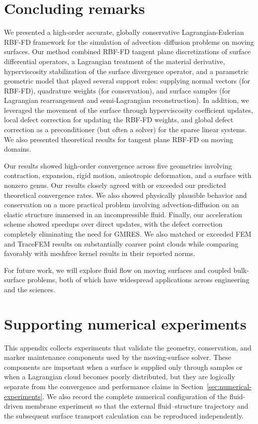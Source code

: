 \documentclass[a4paper,fleqn]{cas-sc}
\begin{document}
\section{Concluding remarks}
\label{sec:conclusions}
We presented a high-order accurate, globally conservative Lagrangian-Eulerian RBF-FD framework for the simulation of advection–diffusion problems on moving surfaces. Our method combined RBF-FD tangent plane discretizations of surface differential operators, a Lagrangian treatment of the material derivative, hyperviscosity stabilization of the surface divergence operator, and a parametric geometric model that played several support roles: supplying normal vectors (for RBF-FD), quadrature weights (for conservation), and surface samples (for Lagrangian rearrangement and semi-Lagrangian reconstruction). In addition, we leveraged the movement of the surface through hyperviscosity coefficient updates, local defect correction for updating the RBF-FD weights, and global defect correction as a preconditioner (but often a solver) for the sparse linear systems. We also presented theoretical results for tangent plane RBF-FD on moving domains.

Our results showed high-order convergence across five geometries involving contraction, expansion, rigid motion, anisotropic deformation, and
a surface with nonzero genus. Our results closely agreed with or exceeded our predicted theoretical convergence rates. We also showed physically plausible behavior and conservation on a more practical problem involving advection-diffusion on an elastic structure immersed in an incompressible fluid. Finally, our acceleration scheme showed speedups over direct updates, with the defect correction completely eliminating the need for GMRES.  We also matched or exceeded FEM and TraceFEM results on substantially coarser point clouds while comparing favorably with meshfree kernel results in their reported norms.

For future work, we will explore fluid flow on moving surfaces and coupled bulk-surface problems, both of which have widespread applications across engineering and the sciences.

\appendix

\section{Supporting numerical experiments}
\label{app:supporting-experiments}

This appendix collects experiments that validate the geometry, conservation,
and marker maintenance components used by the moving-surface solver.  These
components are important when a surface is supplied only through samples or
when a Lagrangian cloud becomes poorly distributed, but they are logically
separate from the convergence and performance claims in
Section~\ref{sec:numerical-experiments}.  We also record the complete numerical
configuration of the fluid-driven membrane experiment so that the external
fluid--structure trajectory and the subsequent surface transport calculation
can be reproduced independently.
\end{document}
